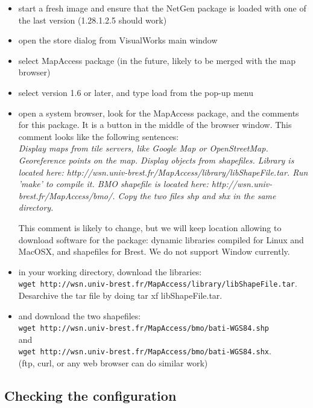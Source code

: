 \begin{itemize}
\item start a fresh image and ensure that the NetGen package is loaded with one of the last
version (1.28.1.2.5 should work)
\item open the store dialog from VisualWorks main window
\item select MapAccess package (in the future, likely to be merged with the map browser)
\item select version 1.6 or later, and type load from the pop-up menu
\item open a system browser, look for the MapAccess package, and the comments 
for this package. It is a button in the middle of the browser window. 
This comment looks like the following sentences:
\\
\emph{Display maps from tile servers, like Google Map or OpenStreetMap.
Georeference points on the map.
Display objects from shapefiles. 
Library is located here: http://wsn.univ-brest.fr/MapAccess/library/libShapeFile.tar. Run 'make' to compile it. 
BMO shapefile is located here: http://wsn.univ-brest.fr/MapAccess/bmo/. Copy the two files shp and shx in the same directory. 
}

This comment is likely to change, but we will keep location allowing to download 
software for the package: dynamic libraries compiled for Linux and MacOSX, and 
shapefiles for Brest. We do not support Window currently. 

\item in your working directory, download the libraries: \\
\verb!wget http://wsn.univ-brest.fr/MapAccess/library/libShapeFile.tar!. 
\\
Desarchive the tar file by doing tar xf libShapeFile.tar. 
\item and download the two shapefiles: 
\\
\verb!wget http://wsn.univ-brest.fr/MapAccess/bmo/bati-WGS84.shp! 
\\ and \\ 
\verb!wget http://wsn.univ-brest.fr/MapAccess/bmo/bati-WGS84.shx!. 
\\
(ftp, curl, or any web browser can do similar work)
\end{itemize}

\subsection{Checking the configuration}

